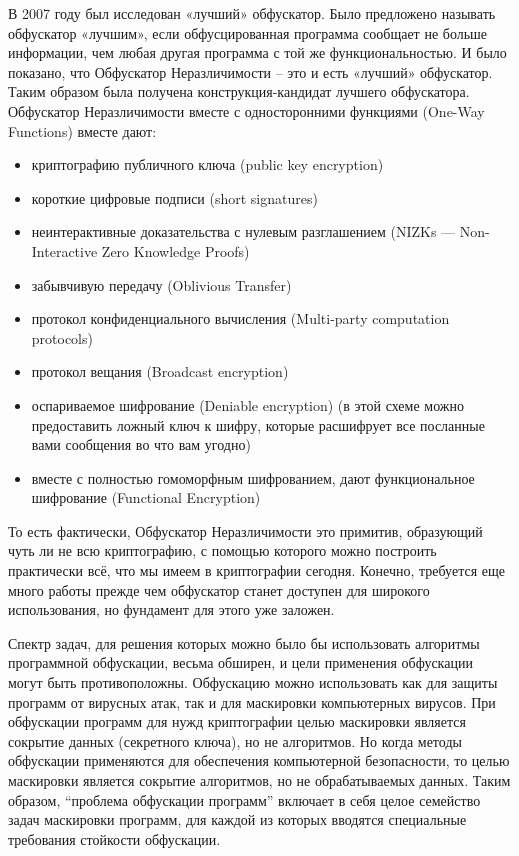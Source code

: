 В 2007\cite{Cit5} году был исследован «лучший» обфускатор. Было предложено называть обфускатор «лучшим», если обфусцированная программа сообщает не больше информации, чем любая другая программа с той же функциональностью. И было показано, что Обфускатор Неразличимости -- это и есть «лучший» обфускатор. Таким образом была получена конструкция-кандидат лучшего обфускатора. Обфускатор Неразличимости вместе с односторонними функциями (One-Way Functions) вместе дают:
\begin{itemize}
\item криптографию публичного ключа (public key encryption)
\item короткие цифровые подписи (short signatures)
\item неинтерактивные доказательства с нулевым разглашением (NIZKs — Non-Interactive Zero Knowledge Proofs)
\item забывчивую передачу (Oblivious Transfer)
\item протокол конфиденциального вычисления (Multi-party computation protocols)
\item протокол вещания (Broadcast encryption)
\item оспариваемое шифрование (Deniable encryption) (в этой схеме можно предоставить ложный ключ к шифру, которые расшифрует все посланные вами сообщения во что вам угодно)
\item вместе с полностью гомоморфным шифрованием, дают функциональное шифрование (Functional Encryption)
\end{itemize}

То есть фактически, Обфускатор Неразличимости это примитив, образующий чуть ли не всю криптографию, с помощью которого можно построить практически всё, что мы имеем в криптографии сегодня. Конечно, требуется еще много работы прежде чем обфускатор станет доступен для широкого использования, но фундамент для этого уже заложен.

Спектр задач, для решения которых можно было бы использовать алгоритмы программной обфускации, весьма обширен, и цели применения обфускации могут быть противоположны. Обфускацию можно использовать как для защиты программ от вирусных атак, так и для маскировки компьютерных вирусов. При обфускации программ для нужд криптографии целью маскировки является сокрытие данных (секретного ключа), но не алгоритмов. Но когда методы обфускации применяются для обеспечения компьютерной безопасности, то целью маскировки является сокрытие алгоритмов, но не обрабатываемых данных. Таким образом, “проблема обфускации программ” включает в себя целое семейство задач маскировки программ, для каждой из которых вводятся специальные требования стойкости обфускации. 

